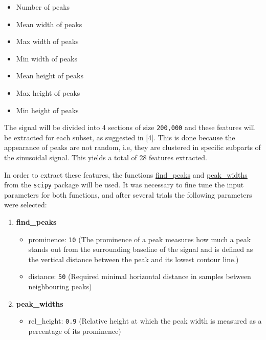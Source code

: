 \documentclass[11pt]{article}
\providecommand{\tightlist}{%
      \setlength{\itemsep}{0pt}\setlength{\parskip}{0pt}}
\begin{document}
\begin{itemize}
\tightlist
\item
  Number of peaks
\item
  Mean width of peaks
\item
  Max width of peaks
\item
  Min width of peaks
\item
  Mean height of peaks
\item
  Max height of peaks
\item
  Min height of peaks
\end{itemize}

The signal will be divided into 4 sections of size \texttt{200,000} and
these features will be extracted for each subset, as suggested in
{[}4{]}. This is done because the appearance of peaks are not random,
i.e, they are clustered in specific subparts of the sinusoidal signal.
This yields a total of 28 features extracted.

In order to extract these features, the functions
\href{https://docs.scipy.org/doc/scipy/reference/generated/scipy.signal.find_peaks.html}{find\_peaks}
and
\href{https://docs.scipy.org/doc/scipy/reference/generated/scipy.signal.peak_widths.html\#scipy.signal.peak_widths}{peak\_widths}
from the \texttt{scipy} package will be used. It was necessary to fine
tune the input parameters for both functions, and after several trials
the following parameters were selected:

\begin{enumerate}
\def\labelenumi{\arabic{enumi}.}
\tightlist
\item
  \textbf{find\_peaks}

  \begin{itemize}
  \item
    prominence: \texttt{10} (The prominence of a peak measures how much
    a peak stands out from the surrounding baseline of the signal and is
    defined as the vertical distance between the peak and its lowest
    contour line.)
  \item
    distance: \texttt{50} (Required minimal horizontal distance in
    samples between neighbouring peaks)
  \end{itemize}
\item
  \textbf{peak\_widths}

  \begin{itemize}
  \tightlist
  \item
    rel\_height: \texttt{0.9} (Relative height at which the peak width
    is measured as a percentage of its prominence)
  \end{itemize}
\end{enumerate}
\end{document}
